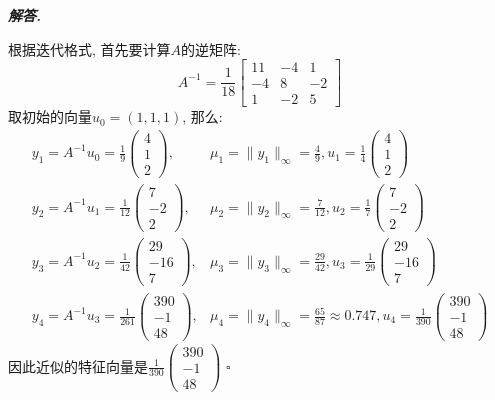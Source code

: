 \documentclass[10pt, a4paper, oneside]{ctexart}
\newcommand{\norm}[1]{\| #1 \|}
\newenvironment{solution}{%
  \par\noindent\textbf{\textit{解答. }}\ignorespaces
}{%
  \hfill\ensuremath{\square}\par %
}
\begin{document}
\begin{solution}
    根据迭代格式, 首先要计算$A$的逆矩阵:
    $$A^{-1}=\frac{1}{18}\begin{bmatrix}
        11&-4&1\\
        -4&8&-2\\
        1&-2&5
    \end{bmatrix}$$
    取初始的向量$u_0=(1,1,1)$, 那么:
    \begin{align*}
        y_1=A^{-1}u_0=\frac{1}{9}\begin{pmatrix}
            4\\1\\2
        \end{pmatrix}, & \mu_1=\norm{y_1}_{\infty}=\frac{4}{9}, u_1=\frac{1}{4}\begin{pmatrix}
            4\\1\\2
        \end{pmatrix}\\
        y_2=A^{-1}u_1=\frac{1}{12}\begin{pmatrix}
            7\\-2\\2
        \end{pmatrix}, & \mu_2=\norm{y_2}_{\infty}=\frac{7}{12}, u_2=\frac{1}{7}\begin{pmatrix}
            7\\-2\\2
        \end{pmatrix}\\
        y_3=A^{-1}u_2=\frac{1}{42}\begin{pmatrix}
            29\\-16\\7
        \end{pmatrix}, & \mu_3=\norm{y_3}_{\infty}=\frac{29}{42}, u_3=\frac{1}{29}\begin{pmatrix}
            29\\-16\\7
        \end{pmatrix}\\
        y_4=A^{-1}u_3=\frac{1}{261}\begin{pmatrix}
            390\\-1\\48
        \end{pmatrix}, & \mu_4=\norm{y_4}_{\infty}=\frac{65}{87}\approx 0.747, u_4=\frac{1}{390}\begin{pmatrix}
            390\\-1\\48
        \end{pmatrix}
    \end{align*}
    因此近似的特征向量是$\frac{1}{390}\begin{pmatrix}
        390\\-1\\48
    \end{pmatrix}$
    \end{solution}
    
\end{document}

